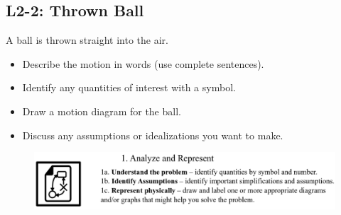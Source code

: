 \documentclass[]{article}
\begin{document}
\begin{TeacherMargin}
\begin{figure}[h]
\end{figure}
\end{TeacherMargin}
\begin{PresentSpace}
\vspace{-0.5cm}
\section*{L2-2: Thrown Ball}
\vspace{-0.2cm}
A ball is thrown straight into the air.
\begin{itemize}
	\item Describe the motion in words (use complete sentences).
	\item Identify any quantities of interest with a symbol.
	\item Draw a motion diagram for the ball.
	\item Discuss any assumptions or idealizations you want to make.
\end{itemize}
\vspace{12cm}
\begin{figure}[h]
	\centering
	\includegraphics[scale=0.4]{AnalyzeAndRepresent.png}
\end{figure}
\end{PresentSpace}
\newpage
\end{document}
